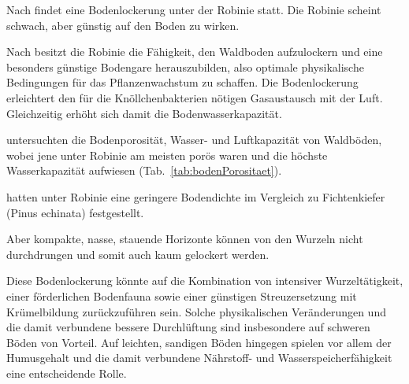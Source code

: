 \documentclass[twocolumn]{scrartcl}
\begin{document}
Nach \citet[S.~474, 483]{ramann1898influssBodendeckeAufPhysikalischeBodeneigenschaften} findet eine Bodenlockerung unter der Robinie statt. Die Robinie scheint schwach, aber günstig auf den Boden zu wirken.

Nach \citet{albert1926robinieBodenlockerheit,penschuck1931robinieBodenphysik} besitzt die Robinie die Fähigkeit, den Waldboden aufzulockern und eine besonders günstige Bodengare herauszubilden, also optimale physikalische Bedingungen für das Pflanzenwachstum zu schaffen. Die Bodenlockerung erleichtert den für die Knöllchenbakterien nötigen Gasaustausch mit der Luft. Gleichzeitig erhöht sich damit die Bodenwasserkapazität.

\citet{nemec1925waldboden} untersuchten die Bodenporosität, Wasser- und Luftkapazität von Waldböden, wobei jene unter Robinie am meisten porös waren und die höchste Wasserkapazität aufwiesen (Tab.~\ref{tab:bodenPorositaet}).

\begin{table}[htbp]
  \centering
  \caption{Bodenpoprosität, Wasser-- und Luftkapazität in \% von Waldböden unter verschiedenen Baumarten nach \citet{nemec1925waldboden}}
  \label{tab:bodenPorositaet}
\end{table}

\citet{ashby1986robinieWuchssteigerung} hatten unter Robinie eine geringere Bodendichte im Vergleich zu Fichtenkiefer (Pinus echinata) festgestellt.

Aber kompakte, nasse, stauende Horizonte können von den Wurzeln nicht durchdrungen \citep{auten1933robineStandort,mueller1991robinie} und somit auch kaum gelockert werden.

Diese Bodenlockerung könnte auf die Kombination von intensiver Wurzeltätigkeit, einer förderlichen Bodenfauna sowie einer günstigen Streuzersetzung mit Krümelbildung zurückzuführen sein. Solche physikalischen Veränderungen und die damit verbundene bessere Durchlüftung sind insbesondere auf schweren Böden von Vorteil. Auf leichten, sandigen Böden hingegen spielen vor allem der Humusgehalt und die damit verbundene Nährstoff- und Wasserspeicherfähigkeit eine entscheidende Rolle.
\end{document}
